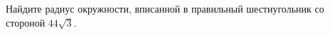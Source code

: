 \begin{ex}
	\begin{condition}
		Найдите радиус окружности, вписанной в правильный шестиугольник со стороной \( 44\sqrt{3} \).
	\end{condition}
\end{ex}